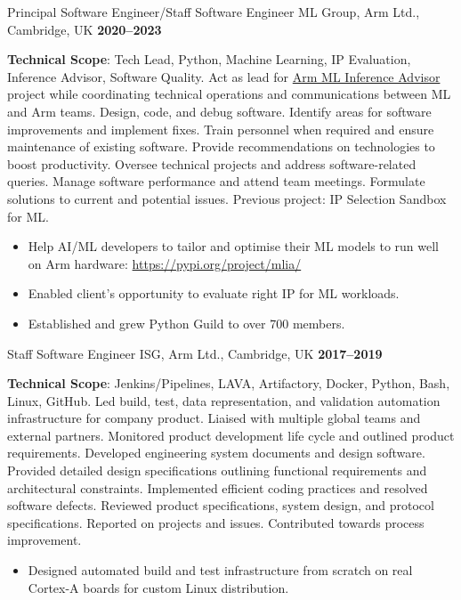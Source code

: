 \documentclass[10pt,a4paper,sans]{moderncv}
\begin{document}
\cventry{}
    {Principal Software Engineer/Staff Software Engineer}
    {ML Group, Arm Ltd., Cambridge, UK}
    {\textbf{2020--2023}}
    {}
    {\textbf{Technical Scope}: Tech Lead, Python, Machine Learning, IP
    Evaluation, Inference Advisor, Software Quality.\newline
    Act as lead for \href{https://pypi.org/project/mlia/}{Arm ML Inference
    Advisor} project while coordinating technical operations and communications
    between ML and Arm teams. Design, code, and debug software. Identify areas
    for software improvements and implement fixes.
    Train personnel when required and ensure maintenance of existing
    software. Provide recommendations on technologies to boost productivity.
    Oversee technical projects and address software-related queries. Manage
    software performance and attend team meetings. Formulate solutions to
    current and potential issues.
    Previous project: IP Selection Sandbox for ML\@.
    \begin{itemize}
        \item Help AI/ML developers to tailor and optimise their ML models to
            run well on Arm hardware: \url{https://pypi.org/project/mlia/}
        \item Enabled client’s opportunity to evaluate right IP for ML
            workloads.
        \item Established and grew Python Guild to over 700 members.
    \end{itemize}}

\cventry{}
    {Staff Software Engineer}
    {ISG, Arm Ltd., Cambridge, UK}
    {\textbf{2017--2019}}
    {}
    {\textbf{Technical Scope}: Jenkins/Pipelines, LAVA, Artifactory, Docker,
    Python, Bash, Linux, GitHub.\newline
    Led build, test, data representation, and validation automation
    infrastructure for company product. Liaised with multiple global teams and
    external partners. Monitored product development life cycle and outlined
    product requirements. Developed engineering system documents and design
    software. Provided detailed design specifications outlining functional
    requirements and architectural constraints. Implemented efficient coding
    practices and resolved software defects. Reviewed product specifications,
    system design, and protocol specifications. Reported on projects and
    issues. Contributed towards process improvement.
    \begin{itemize}
        \item Designed automated build and test infrastructure from scratch on
            real Cortex-A boards for custom Linux distribution.
    \end{itemize}}
\end{document}
